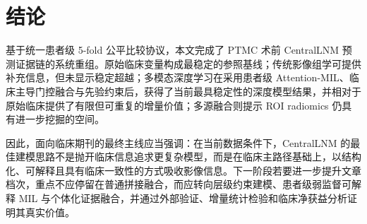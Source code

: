 \section{结论}

基于统一患者级 5-fold 公平比较协议，本文完成了 PTMC 术前 CentralLNM 预测证据链的系统重组。原始临床变量构成最稳定的参照基线；传统影像组学可提供补充信息，但未显示稳定超越；多模态深度学习在采用患者级 Attention-MIL、临床主导门控融合与先验约束后，获得了当前最具稳定性的深度模型结果，并相对于原始临床提供了有限但可重复的增量价值；多源融合则提示 ROI radiomics 仍具有进一步挖掘的空间。

因此，面向临床期刊的最终主线应当强调：在当前数据条件下，CentralLNM 的最佳建模思路不是抛开临床信息追求更复杂模型，而是在临床主路径基础上，以结构化、可解释且具有临床一致性的方式吸收影像信息。下一阶段若要进一步提升文章档次，重点不应停留在普通拼接融合，而应转向层级约束建模、患者级弱监督可解释 MIL 与个体化证据融合，并通过外部验证、增量统计检验和临床净获益分析证明其真实价值。
